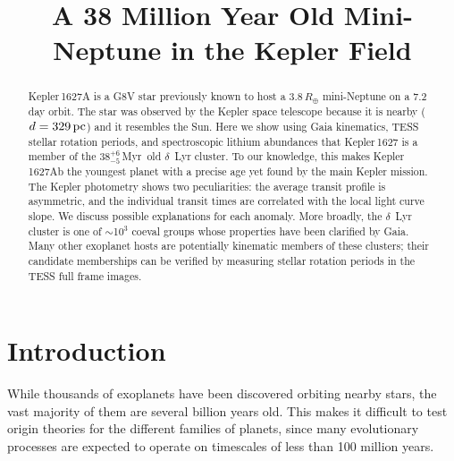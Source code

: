 \documentclass[12pt,modern,twocolumn,tighten]{aastex63}
\newcommand{\clusterage}{$38^{+6}_{-5}$\,Myr} %
\begin{document}
\title{
  A 38 Million Year Old Mini-Neptune in the Kepler Field
}



\begin{abstract}
  Kepler\,1627A is a G8V star previously known to host a
  $3.8\,R_\oplus$ mini-Neptune on a 7.2\,day orbit.  The star was
  observed by the Kepler space telescope because it is nearby
  ($d=329\,{\rm pc}$) and it resembles the Sun.  Here we show using
  Gaia kinematics, TESS stellar rotation periods, and spectroscopic
  lithium abundances that Kepler\,1627 is a member of the \clusterage\
  old $\delta$~Lyr cluster.  To our knowledge, this makes
  Kepler\,1627Ab the youngest planet with a precise age yet found by
  the main Kepler mission.  The Kepler photometry shows two
  peculiarities: the average transit profile is asymmetric, and the
  individual transit times are correlated with the local light curve
  slope.  We discuss possible explanations for each anomaly.  More
  broadly, the $\delta$~Lyr cluster
  is one of $\sim$10$^3$ coeval groups whose properties have been clarified
  by Gaia.  Many other exoplanet hosts are potentially kinematic members
  of these clusters; their candidate memberships can be verified by
  measuring stellar rotation periods in the TESS full frame images.
\end{abstract}




\section{Introduction}

While thousands of exoplanets have been discovered orbiting nearby
stars, the vast majority of them are several billion years old.  This
makes it difficult to test origin theories for the different families
of planets, since many evolutionary processes are expected to operate
on timescales of less than 100 million years.
\end{document}
